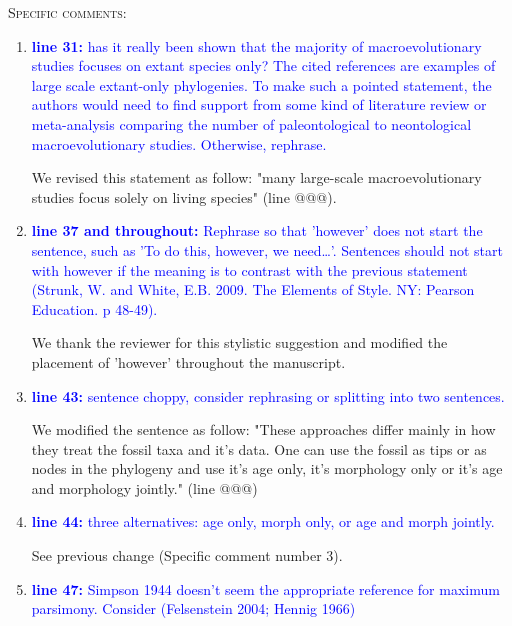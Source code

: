 \documentclass[12pt,letterpaper]{article}
\renewcommand{\section}[1]{%
\bigskip
\begin{center}
\begin{Large}
\normalfont\scshape #1
\medskip
\end{Large}
\end{center}}
\begin{document}
\section{Specific comments:}
\begin{enumerate}

\item{\textcolor{blue}{\textbf{line 31:} has it really been shown that the majority of macroevolutionary studies focuses on extant species only? The cited references are examples of large scale extant-only phylogenies. To make such a pointed statement, the authors would need to find support from some kind of literature review or meta-analysis comparing the number of paleontological to neontological macroevolutionary studies. Otherwise, rephrase. }}

We revised this statement as follow: "many large-scale macroevolutionary studies focus solely on living species" (line @@@).

\item{\textcolor{blue}{\textbf{line 37 and throughout:} Rephrase so that 'however' does not start the sentence, such as 'To do this, however, we need…'. Sentences should not start with however if the meaning is to contrast with the previous statement (Strunk, W. and White, E.B. 2009. The Elements of Style. NY: Pearson Education. p 48-49).}}

We thank the reviewer for this stylistic suggestion and modified the placement of 'however' throughout the manuscript.

\item{\textcolor{blue}{\textbf{line 43:} sentence choppy, consider rephrasing or splitting into two sentences.}}

We modified the sentence as follow: "These approaches differ mainly in how they treat the fossil taxa and it's data. One can use the fossil as tips or as nodes in the phylogeny and use it's age only, it's morphology only or it's age and morphology jointly." (line @@@)

\item{\textcolor{blue}{\textbf{line 44:} three alternatives: age only, morph only, or age and morph jointly. }}

See previous change (Specific comment number 3).

\item{\textcolor{blue}{\textbf{line 47:} Simpson 1944 doesn't seem the appropriate reference for maximum parsimony. Consider (Felsenstein 2004; Hennig 1966) }}


\end{enumerate}
\end{document}
